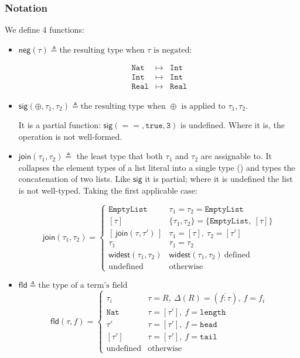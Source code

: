 \documentclass[11pt,a4paper]{article}
\newcommand{\kw}[1]{\mathtt{#1}}                     %
\newcommand{\rn}[1]{\TirNameStyle{#1}}
\begin{document}
\subsubsection{Notation}
We define 4 functions:
\begin{itemize}
	\item $\mathsf{neg}(\tau)\triangleq \text{the resulting type when $\tau$ is negated}$:
	
	$$
	\begin{array}{rcl}
	\kw{Nat} & \mapsto & \kw{Int} \\
	\kw{Int} & \mapsto & \kw{Int} \\
	\kw{Real} & \mapsto & \kw{Real}
	\end{array}
	$$
	\item $\mathsf{sig}(\oplus, \tau_1, \tau_2)\triangleq \text{the resulting type when $\oplus$ is applied to $\tau_1,\tau_2$}$.
	
	It is a partial function: $\mathsf{sig}(==, \kw{true}, \kw{3})$ is undefined. Where it is, the operation is not well-formed.
	
	\item $\mathsf{join}(\tau_1, \tau_2)\triangleq$ the least type that both $\tau_1$ and $\tau_2$ are assignable to. It collapses the element types of a list literal into a single type (\rn{TE-LIST}) and types the concatenation of two lists. Like $\mathsf{sig}$ it is partial; where it is undefined the list is not well-typed. Taking the first applicable case:

	$$
	\mathsf{join}(\tau_1, \tau_2) =
	\begin{cases}
		\kw{EmptyList} & \tau_1 = \tau_2 = \kw{EmptyList} \\
		[\tau] & \{\tau_1, \tau_2\} = \{\kw{EmptyList},\ [\tau]\} \\
		[\,\mathsf{join}(\tau, \tau')\,] & \tau_1 = [\tau],\ \tau_2 = [\tau'] \\
		\tau_1 & \tau_1 = \tau_2 \\
		\mathsf{widest}(\tau_1, \tau_2) & \mathsf{widest}(\tau_1, \tau_2)\ \text{defined} \\
		\text{undefined} & \text{otherwise}
	\end{cases}
	$$
	
	\item $\mathsf{fld}\triangleq\text{the type of a term's field}$
	\[
	\mathsf{fld}(\tau, f) =
	\begin{cases}
		\tau_i           & \tau = R,\ \Delta(R) = (\overline{f{:}\tau}),\ f = f_i \\
		\kw{Nat}         & \tau = [\tau'],\ f = \kw{length} \\
		\tau'            & \tau = [\tau'],\ f = \kw{head} \\
		{[\tau']}        & \tau = [\tau'],\ f = \kw{tail} \\
		\text{undefined} & \text{otherwise}
	\end{cases}
	\]
	
\end{itemize}
\end{document}
